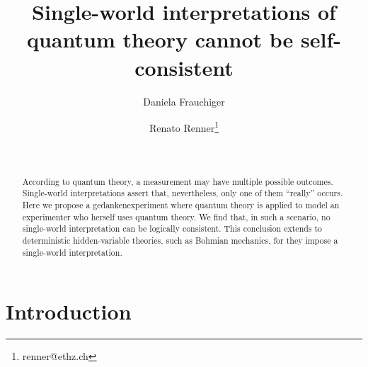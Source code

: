 \documentclass[12pt]{article}
\theoremstyle{plain}
\theoremstyle{definition}
\begin{document}
\title{Single-world interpretations of quantum theory cannot be self-consistent}

\author{Daniela Frauchiger \and Renato Renner\thanks{renner@ethz.ch}  \and \\}


\date{}
\maketitle

\begin{abstract}
According to quantum theory, a measurement may have multiple possible outcomes.  Single-world interpretations assert that, nevertheless, only one of them ``really'' occurs.  Here we propose a gedankenexperiment where quantum theory is applied to model an experimenter who herself uses quantum theory. We find that, in such a scenario, no single-world interpretation can be logically consistent.  This conclusion extends to deterministic hidden-variable theories, such as Bohmian mechanics, for they impose a single-world interpretation.
\end{abstract}


\newpage

\section{Introduction} \label{sec_intro}
\end{document}
